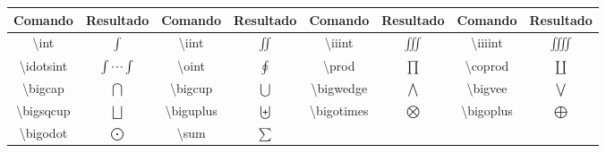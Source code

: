 % 
% 
% 
% 
% 
\begin{tabular}{cc|cc|cc|cc}
    \hline
    Comando & Resultado & Comando & Resultado & Comando & Resultado & Comando & Resultado \\ \hline
    \textbackslash\textsf{int} & $\int$ & \textbackslash\textsf{iint} & $\iint$ & \textbackslash\textsf{iiint} & $\iiint$ & \textbackslash\textsf{iiiint} & $\iiiint$ \\
    \textbackslash\textsf{idotsint} & $\idotsint$ & \textbackslash\textsf{oint} & $\oint$ & \textbackslash\textsf{prod} & $\prod$ & \textbackslash\textsf{coprod} & $\coprod$ \\ 
    \textbackslash\textsf{bigcap} & $\bigcap$ & \textbackslash\textsf{bigcup} & $\bigcup$ & \textbackslash\textsf{bigwedge} & $\bigwedge$ & \textbackslash\textsf{bigvee} & $\bigvee$ \\ 
    \textbackslash\textsf{bigsqcup} & $\bigsqcup$ & \textbackslash\textsf{biguplus} & $\biguplus$ & \textbackslash\textsf{bigotimes} & $\bigotimes$ & \textbackslash\textsf{bigoplus} & $\bigoplus$ \\ 
    \textbackslash\textsf{bigodot} & $\bigodot$ & \textbackslash\textsf{sum} & $\sum$ & & & & \\ \hline
\end{tabular}
